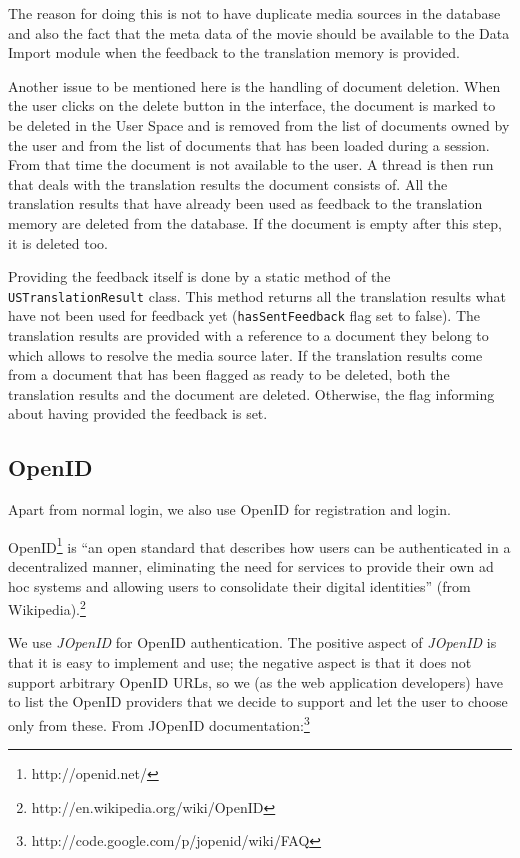The reason for doing this is not to have duplicate media sources in the database and also the fact that the meta data of the movie should be available to the Data Import module when the feedback to the translation memory is provided.

Another issue to be mentioned here is the handling of document deletion. When the user clicks on the delete button in the interface, the document is marked to be deleted in the User Space and is removed from the list of documents owned by the user and from the list of documents that has been loaded during a session. From that time the document is not available to the user. A thread is then run that deals with the translation results the document consists of. All the translation results that have already been used as feedback to the translation memory are deleted from the database. If the document is empty after this step, it is deleted too.

Providing the feedback itself is done by a static method of the {\tt USTranslationResult} class. This method returns all the translation results what have not been used for feedback yet ({\tt hasSentFeedback} flag set to false). The translation results are provided with a reference to a document they belong to which allows to resolve the media source later. If the translation results come from a document that has been flagged as ready to be deleted, both the translation results and the document are deleted. Otherwise, the flag informing about having provided the feedback is set.

\subsection{OpenID}
\label{us:openid}
Apart from normal login, we also use OpenID for registration and login.

OpenID\footnote{http://openid.net/} is ``an open standard that describes how users can be authenticated in a decentralized manner, eliminating the need for services to provide their own ad hoc systems and allowing users to consolidate their digital identities'' (from Wikipedia).\footnote{http://en.wikipedia.org/wiki/OpenID}

We use \emph{JOpenID} for OpenID authentication. The positive aspect of \emph{JOpenID} is that it is easy to implement and use; the negative aspect is that it does not support arbitrary OpenID URLs, so we (as the web application developers) have to list the OpenID providers that we decide to support and let the user to choose only from these. From JOpenID documentation:\footnote{http://code.google.com/p/jopenid/wiki/FAQ}


